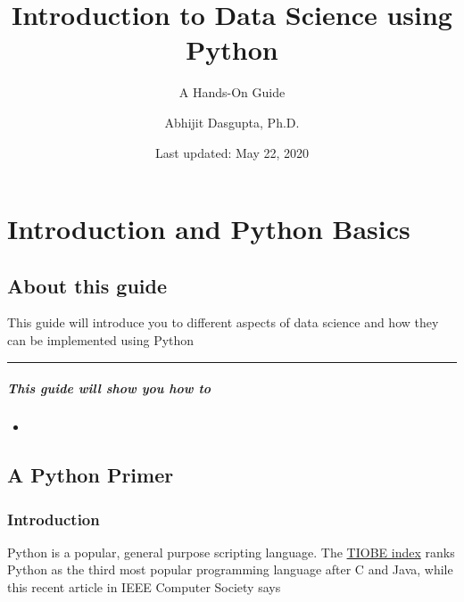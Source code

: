 \documentclass[
  letterpaper,
]{scrbook}
\title{Introduction to Data Science using Python}
\subtitle{A Hands-On Guide}
\author{Abhijit Dasgupta, Ph.D.}
\date{Last updated: May 22, 2020}
\providecommand{\tightlist}{%
  \setlength{\itemsep}{0pt}\setlength{\parskip}{0pt}}
\begin{document}
\maketitle

{
\setcounter{tocdepth}{1}
\tableofcontents
}
\hypertarget{part-introduction-and-python-basics}{%
\part{Introduction and Python Basics}\label{part-introduction-and-python-basics}}

\hypertarget{about-this-guide}{%
\chapter{About this guide}\label{about-this-guide}}

This guide will introduce you to different aspects of data science and
how they can be implemented using Python

\begin{center}\rule{0.5\linewidth}{0.5pt}\end{center}

\hypertarget{this-guide-will-show-you-how-to}{%
\subsubsection*{This guide will show you how to}\label{this-guide-will-show-you-how-to}}

\begin{itemize}
\tightlist
\item
\end{itemize}

\hypertarget{a-python-primer}{%
\chapter{A Python Primer}\label{a-python-primer}}

\hypertarget{introduction}{%
\section{Introduction}\label{introduction}}

Python is a popular, general purpose scripting language. The \href{https://www.tiobe.com/tiobe-index/}{TIOBE index} ranks Python as the third most popular programming language after C and Java, while this recent article in IEEE Computer Society says
\end{document}
